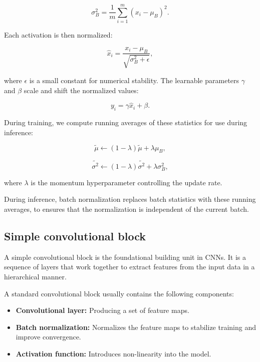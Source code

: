 \begin{equation}
    \sigma_B^2 = \frac{1}{m} \sum_{i=1}^{m} (x_i - \mu_B)^2.
\end{equation}

Each activation is then normalized:

\begin{equation}
    \hat{x}_i = \frac{x_i - \mu_B}{\sqrt{\sigma_B^2 + \epsilon}},
\end{equation}

where $\epsilon$ is a small constant for numerical stability. The learnable parameters $\gamma$ and $\beta$ scale and shift the normalized values:

\begin{equation}
    y_i = \gamma \hat{x}_i + \beta.
\end{equation}

During training, we compute running averages of these statistics for use during inference:

\begin{equation}
\tilde{\mu} \leftarrow (1 - \lambda) \tilde{\mu} + \lambda \mu_B,
\end{equation}

\begin{equation}
\tilde{\sigma^2} \leftarrow (1 - \lambda) \tilde{\sigma^2} + \lambda \sigma^2_B,
\end{equation}

where $\lambda$ is the momentum hyperparameter controlling the update rate.

During inference, batch normalization replaces batch statistics with these running averages, to ensures that the normalization is independent of the current batch.

\subsection{Simple convolutional block}

A simple convolutional block is the foundational building unit in CNNs. It is a sequence of layers that work together to extract features from the input data in a hierarchical manner. 

A standard convolutional block usually contains the following components:

\begin{itemize}
    \item \textbf{Convolutional layer:} Producing a set of feature maps.
    \item \textbf{Batch normalization:} Normalizes the feature maps to stabilize training and improve convergence.
    \item \textbf{Activation function:} Introduces non-linearity into the model.
\end{itemize}

